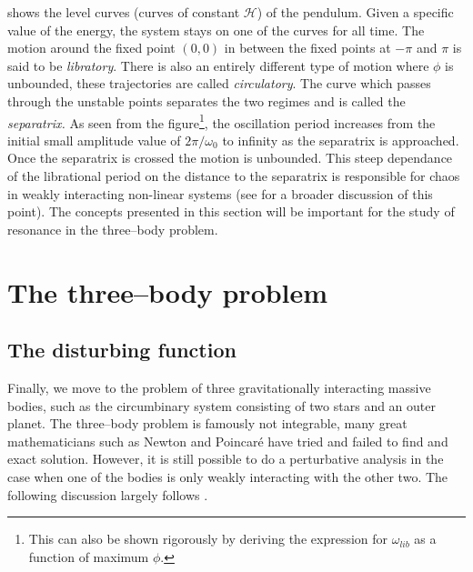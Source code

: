 \documentclass[ twoside,openright,titlepage,numbers=noenddot,headinclude,%
                footinclude=true,cleardoublepage=empty,abstractoff, %
                BCOR=5mm,paper=a4,fontsize=11pt,%
                american,%
                ]{scrreprt}
\begin{document}
 shows the level curves (curves of constant $\mathcal{H}$)
of the pendulum. Given a specific value of the energy, the system stays 
on one of the curves for all time. The motion around the fixed point $(0,0)$
 in between the fixed points at $-\pi$ and $\pi$ is said to be \emph{libratory}.
There is also an entirely different type of motion where $\phi$ is unbounded,
these trajectories are called \emph{circulatory}. The curve which passes through
the unstable points separates the two regimes and is called the \emph{separatrix.} 
As seen from the figure\footnote{This can also be shown rigorously by deriving the
expression for $\omega_{lib}$ as a function of maximum $\phi$.},
the oscillation period increases from the initial
small amplitude value of $2\pi/\omega_0$ to infinity as the separatrix is
approached. Once the separatrix is crossed the motion is unbounded. This
steep dependance of the librational period on the distance to the separatrix is
responsible for chaos in weakly interacting non-linear systems (see
\cite{cambridgenbody} for a broader discussion of this point). The concepts
presented in this section will be important for the study of resonance in the
three--body problem.

\section{The three--body problem}
\label{sec:three_body}
\subsection{The disturbing function}
Finally, we move to the problem of three gravitationally interacting massive 
bodies, such as the circumbinary system consisting of two stars and 
an outer planet. The three--body problem is famously not integrable, many 
great mathematicians such as Newton and Poincaré have tried and failed to find and
exact solution. However, it is still possible to do a perturbative analysis
in the case when one of the bodies is only weakly interacting with the
other two. The following discussion largely follows \citet{Mardling2013}.
\end{document}

